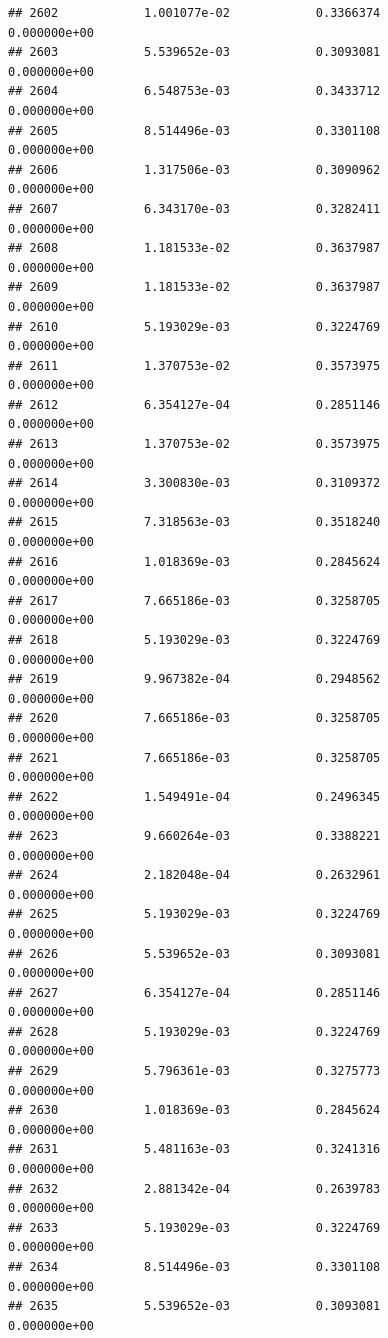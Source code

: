 \documentclass[
]{article}
\begin{document}
\begin{verbatim}
## 2602            1.001077e-02            0.3366374            0.000000e+00
## 2603            5.539652e-03            0.3093081            0.000000e+00
## 2604            6.548753e-03            0.3433712            0.000000e+00
## 2605            8.514496e-03            0.3301108            0.000000e+00
## 2606            1.317506e-03            0.3090962            0.000000e+00
## 2607            6.343170e-03            0.3282411            0.000000e+00
## 2608            1.181533e-02            0.3637987            0.000000e+00
## 2609            1.181533e-02            0.3637987            0.000000e+00
## 2610            5.193029e-03            0.3224769            0.000000e+00
## 2611            1.370753e-02            0.3573975            0.000000e+00
## 2612            6.354127e-04            0.2851146            0.000000e+00
## 2613            1.370753e-02            0.3573975            0.000000e+00
## 2614            3.300830e-03            0.3109372            0.000000e+00
## 2615            7.318563e-03            0.3518240            0.000000e+00
## 2616            1.018369e-03            0.2845624            0.000000e+00
## 2617            7.665186e-03            0.3258705            0.000000e+00
## 2618            5.193029e-03            0.3224769            0.000000e+00
## 2619            9.967382e-04            0.2948562            0.000000e+00
## 2620            7.665186e-03            0.3258705            0.000000e+00
## 2621            7.665186e-03            0.3258705            0.000000e+00
## 2622            1.549491e-04            0.2496345            0.000000e+00
## 2623            9.660264e-03            0.3388221            0.000000e+00
## 2624            2.182048e-04            0.2632961            0.000000e+00
## 2625            5.193029e-03            0.3224769            0.000000e+00
## 2626            5.539652e-03            0.3093081            0.000000e+00
## 2627            6.354127e-04            0.2851146            0.000000e+00
## 2628            5.193029e-03            0.3224769            0.000000e+00
## 2629            5.796361e-03            0.3275773            0.000000e+00
## 2630            1.018369e-03            0.2845624            0.000000e+00
## 2631            5.481163e-03            0.3241316            0.000000e+00
## 2632            2.881342e-04            0.2639783            0.000000e+00
## 2633            5.193029e-03            0.3224769            0.000000e+00
## 2634            8.514496e-03            0.3301108            0.000000e+00
## 2635            5.539652e-03            0.3093081            0.000000e+00

\end{verbatim}
\end{document}
